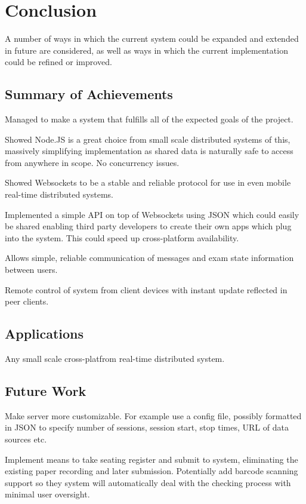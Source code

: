
\chapter{Conclusion}

\label{ch:conclusions}

A number of ways in which the current system could be expanded and extended in future are considered, as well as ways in which the current implementation could be refined or improved.

\section{Summary of Achievements}

Managed to make a system that fulfills all of the expected goals of the project.

Showed Node.JS is a great choice from small scale distributed systems of this, massively simplifying implementation as shared data is naturally safe to access from anywhere in scope.  No concurrency issues.

Showed Websockets to be a stable and reliable protocol for use in even mobile real-time distributed systems.

Implemented a simple API on top of Websockets using JSON which could easily be shared enabling third party developers to create their own apps which plug into the system.  This could speed up cross-platform availability.

Allows simple, reliable communication of messages and exam state information between users.

Remote control of system from client devices with instant update reflected in peer clients.

\section{Applications}

Any small scale cross-platfrom real-time distributed system.

\section{Future Work}

Make server more customizable.  For example use a config file, possibly formatted in JSON to specify number of sessions, session start, stop times, URL of data sources etc.

Implement means to take seating register and submit to system, eliminating the existing paper recording and later submission.  Potentially add barcode scanning support so they system will automatically deal with the checking process with minimal user oversight.

